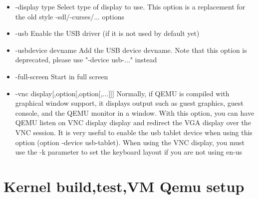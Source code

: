\documentclass[letterpaper,10pt,fleqn]{article}
\begin{document}
\begin{itemize}
		\item-display type
           Select type of display to use. This option is a replacement for the
           old style -sdl/-curses/... options
		\item-usb
           Enable the USB driver (if it is not used by default yet)

		\item-usbdevice devname
           Add the USB device devname. Note that this option is deprecated,
           please use "-device usb-..." instead
		\item -full-screen
           Start in full screen
		\item-vnc display[,option[,option[,...]]]
           Normally, if QEMU is compiled with graphical window support, it
           displays output such as guest graphics, guest console, and the QEMU
           monitor in a window. With this option, you can have QEMU listen on
           VNC display display and redirect the VGA display over the VNC
           session. It is very useful to enable the usb tablet device when using
           this option (option -device usb-tablet). When using the VNC display,
           you must use the -k parameter to set the keyboard layout if you are
           not using en-us

	\end{itemize}

	\section*{Kernel build,test,VM Qemu setup}
\end{document}
